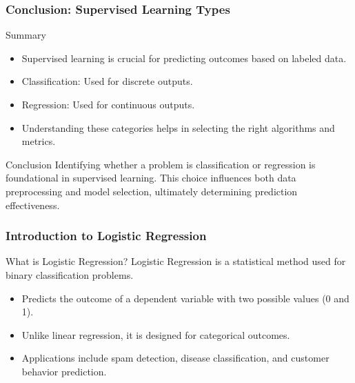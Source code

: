 \documentclass[aspectratio=169]{beamer}
\begin{document}
\begin{frame}[fragile]
    \frametitle{Conclusion: Supervised Learning Types}
    \begin{block}{Summary}
        \begin{itemize}
            \item Supervised learning is crucial for predicting outcomes based on labeled data.
            \item Classification: Used for discrete outputs.
            \item Regression: Used for continuous outputs.
            \item Understanding these categories helps in selecting the right algorithms and metrics.
        \end{itemize}
    \end{block}
    
    \begin{block}{Conclusion}
        Identifying whether a problem is classification or regression is foundational in supervised learning. This choice influences both data preprocessing and model selection, ultimately determining prediction effectiveness.
    \end{block}
\end{frame}

\begin{frame}[fragile]
    \frametitle{Introduction to Logistic Regression}
    \begin{block}{What is Logistic Regression?}
        Logistic Regression is a statistical method used for binary classification problems.
    \end{block}
    \begin{itemize}
        \item Predicts the outcome of a dependent variable with two possible values (0 and 1).
        \item Unlike linear regression, it is designed for categorical outcomes.
        \item Applications include spam detection, disease classification, and customer behavior prediction.
    \end{itemize}
\end{frame}
\end{document}
